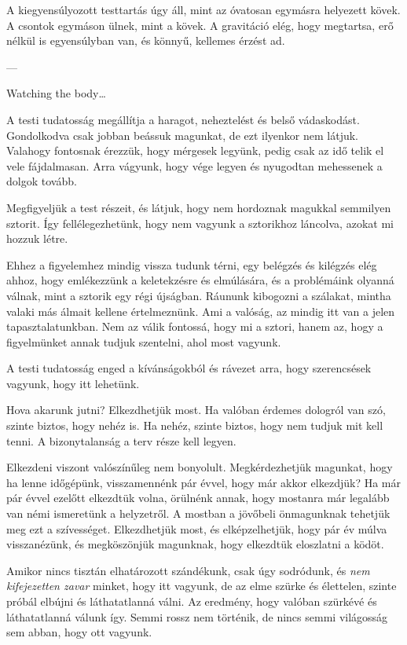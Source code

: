 A kiegyensúlyozott testtartás úgy áll, mint az óvatosan egymásra
helyezett kövek. A csontok egymáson ülnek, mint a kövek. A gravitáció
elég, hogy megtartsa, erő nélkül is egyensúlyban van, és könnyű,
kellemes érzést ad.

---

Watching the body\ldots{}

A testi tudatosság megállítja a haragot, neheztelést és belső
vádaskodást. Gondolkodva csak jobban beássuk magunkat, de ezt ilyenkor
nem látjuk. Valahogy fontosnak érezzük, hogy mérgesek legyünk, pedig
csak az idő telik el vele fájdalmasan. Arra vágyunk, hogy vége legyen és
nyugodtan mehessenek a dolgok tovább.

Megfigyeljük a test részeit, és látjuk, hogy nem hordoznak magukkal
semmilyen sztorit. Így fellélegezhetünk, hogy nem vagyunk a sztorikhoz
láncolva, azokat mi hozzuk létre.

Ehhez a figyelemhez mindig vissza tudunk térni, egy belégzés és kilégzés
elég ahhoz, hogy emlékezzünk a keletekzésre és elmúlására, és a
problémáink olyanná válnak, mint a sztorik egy régi újságban. Ráununk
kibogozni a szálakat, mintha valaki más álmait kellene értelmeznünk. Ami
a valóság, az mindig itt van a jelen tapasztalatunkban. Nem az válik
fontossá, hogy mi a sztori, hanem az, hogy a figyelmünket annak tudjuk
szentelni, ahol most vagyunk.

A testi tudatosság enged a kívánságokból és rávezet arra, hogy
szerencsések vagyunk, hogy itt lehetünk.

Hova akarunk jutni? Elkezdhetjük most. Ha valóban érdemes dologról van
szó, szinte biztos, hogy nehéz is. Ha nehéz, szinte biztos, hogy nem
tudjuk mit kell tenni. A bizonytalanság a terv része kell legyen.

Elkezdeni viszont valószínűleg nem bonyolult. Megkérdezhetjük magunkat,
hogy ha lenne időgépünk, visszamennénk pár évvel, hogy már akkor
elkezdjük? Ha már pár évvel ezelőtt elkezdtük volna, örülnénk annak,
hogy mostanra már legalább van némi ismeretünk a helyzetről. A mostban a
jövőbeli önmagunknak tehetjük meg ezt a szívességet. Elkezdhetjük most,
és elképzelhetjük, hogy pár év múlva visszanézünk, és megköszönjük
magunknak, hogy elkezdtük eloszlatni a ködöt.

Amikor nincs tisztán elhatározott szándékunk, csak úgy sodródunk, és
\emph{nem kifejezetten zavar} minket, hogy itt vagyunk, de az elme
szürke és élettelen, szinte próbál elbújni és láthatatlanná válni. Az
eredmény, hogy valóban szürkévé és láthatatlanná válunk így. Semmi rossz
nem történik, de nincs semmi világosság sem abban, hogy ott vagyunk.

